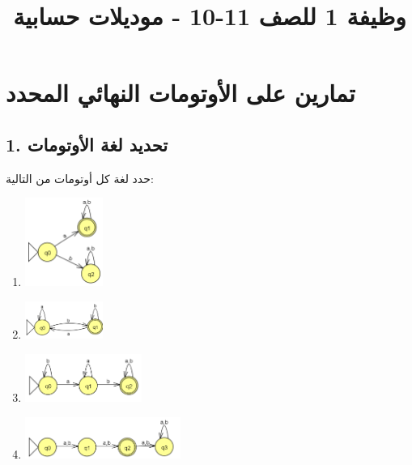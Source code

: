 \documentclass[12pt]{article}
\title{وظيفة 1 للصف 11-10 - موديلات حسابية}
\begin{document}
\maketitle

\section*{تمارين على الأوتومات النهائي المحدد}

\subsection*{1. تحديد لغة الأوتومات}

حدد لغة كل أوتومات من التالية:

\begin{enumerate}

\item
\includegraphics[width=0.2\textwidth]{../../../images/DFAs/ex1_q1.png}\\

\item
\includegraphics[width=0.2\textwidth]{../../../images/DFAs/ex1_q2.png}\\

\item
\includegraphics[width=0.3\textwidth]{../../../images/DFAs/ex1_q3.png}\\

\item
\includegraphics[width=0.4\textwidth]{../../../images/DFAs/ex1_q4.png}\\


\end{enumerate}
\end{document}
